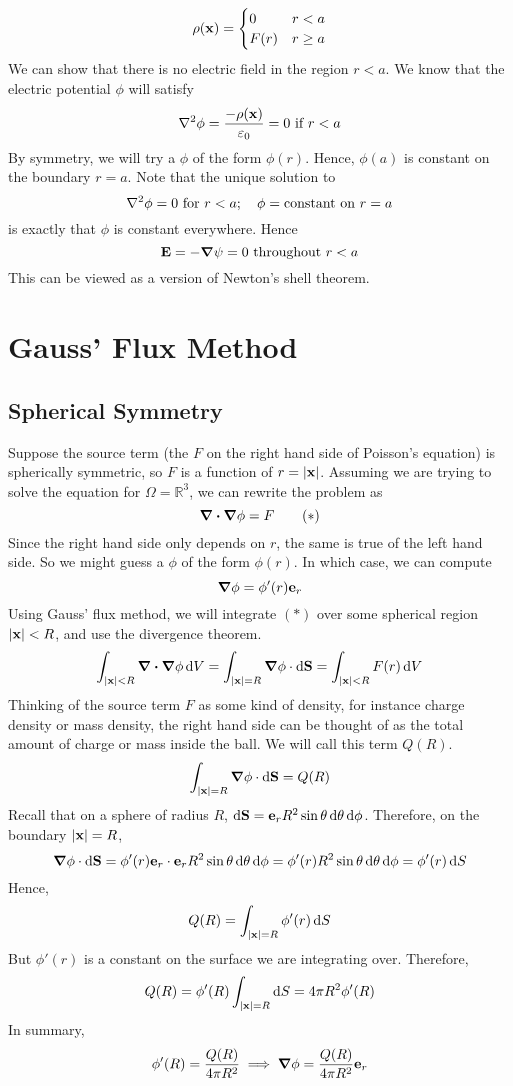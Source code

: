 \documentclass{article}
\begin{document}
\[ \rho(\vb x) = \begin{cases}
		0    & r < a    \\
		F(r) & r \geq a
	\end{cases} \]
We can show that there is no electric field in the region $r < a$. We know that the electric potential $\phi$ will satisfy
\[ \laplacian{\phi} = \frac{-\rho(\vb x)}{\varepsilon_0} = 0 \text{ if } r<a \]
By symmetry, we will try a $\phi$ of the form $\phi(r)$. Hence, $\phi(a)$ is constant on the boundary $r=a$. Note that the unique solution to
\[ \laplacian{\phi} = 0 \text{ for } r<a;\quad \phi = \text{constant on } r = a \]
is exactly that $\phi$ is constant everywhere. Hence
\[ \vb E = -\grad{\psi} = 0 \text{ throughout } r<a \]
This can be viewed as a version of Newton's shell theorem.

\section{Gauss' Flux Method}
\subsection{Spherical Symmetry}
Suppose the source term (the $F$ on the right hand side of Poisson's equation) is spherically symmetric, so $F$ is a function of $r = \abs{\vb x}$. Assuming we are trying to solve the equation for $\Omega = \mathbb R^3$, we can rewrite the problem as
\begin{equation}
	\div{\grad{\phi}} = F
	\tag{$\ast$}
\end{equation}
Since the right hand side only depends on $r$, the same is true of the left hand side. So we might guess a $\phi$ of the form $\phi(r)$. In which case, we can compute
\[ \grad{\phi} = \phi'(r) \vb e_r \]
Using Gauss' flux method, we will integrate $(\ast)$ over some spherical region $\abs{\vb x} < R$, and use the divergence theorem.
\[ \int_{\abs{\vb x} < R} \div{\grad{\phi}}\dd{V} = \int_{\abs{\vb x} = R} \grad{\phi} \cdot \dd{\vb S} = \int_{\abs{\vb x} < R} F(r) \dd{V} \]
Thinking of the source term $F$ as some kind of density, for instance charge density or mass density, the right hand side can be thought of as the total amount of charge or mass inside the ball. We will call this term $Q(R)$.
\[ \int_{\abs{\vb x} = R} \grad{\phi} \cdot \dd{\vb S} = Q(R) \]
Recall that on a sphere of radius $R$, $\dd{\vb S} = \vb e_r R^2 \sin\theta \dd{\theta}\dd{\phi}$. Therefore, on the boundary $\abs{\vb x} = R$,
\[ \grad{\phi} \cdot \dd{\vb S} = \phi'(r) \vb e_r \cdot \vb e_r R^2 \sin\theta \dd{\theta}\dd{\phi} = \phi'(r) R^2 \sin\theta \dd{\theta}\dd{\phi} = \phi'(r) \dd{S} \]
Hence,
\[ Q(R) = \int_{\abs{\vb x} = R} \phi'(r) \dd{S} \]
But $\phi'(r)$ is a constant on the surface we are integrating over. Therefore,
\[ Q(R) = \phi'(R) \int_{\abs{\vb x} = R} \dd{S} = 4\pi R^2 \phi'(R) \]
In summary,
\[ \phi'(R) = \frac{Q(R)}{4\pi R^2} \implies \grad{\phi} = \frac{Q(R)}{4\pi R^2} \vb e_r \]
\end{document}
